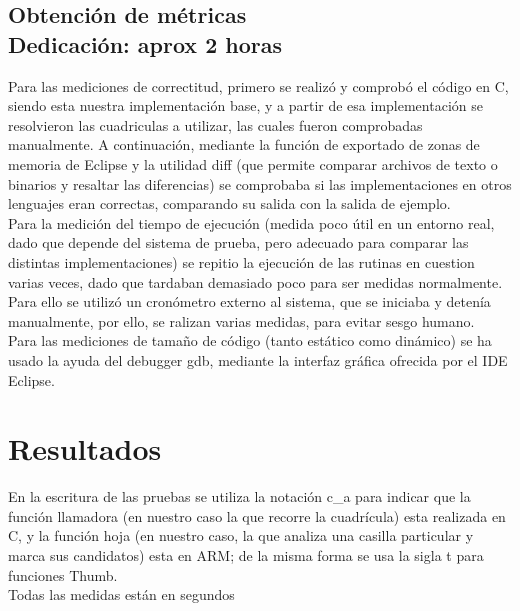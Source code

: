 \documentclass[12pt,letterpaper]{article}
\begin{document}
\subsection{Obtención de métricas\\ {\small Dedicación: aprox 2 horas}}
Para las mediciones de correctitud, primero se realizó y comprobó el
código en C, siendo esta nuestra implementación base, y a partir de
esa implementación se resolvieron las cuadriculas a utilizar, las
cuales fueron comprobadas manualmente. A continuación, mediante la
función de exportado de zonas de memoria de Eclipse y la utilidad diff
(que permite comparar archivos de texto o binarios y resaltar las
diferencias) se comprobaba si las implementaciones en otros lenguajes
eran correctas, comparando su salida con la salida de ejemplo.\\
Para la medición del tiempo de ejecución (medida poco útil en un
entorno real, dado que depende del sistema de prueba, pero adecuado
para comparar las distintas implementaciones) se repitio la ejecución
de las rutinas en cuestion varias veces, dado que tardaban demasiado
poco para ser medidas normalmente. Para ello se utilizó un cronómetro
externo al sistema, que se iniciaba y detenía manualmente, por ello,
se ralizan varias medidas, para evitar sesgo humano.\\
Para las mediciones de tamaño de código (tanto estático como dinámico)
se ha usado la ayuda del debugger gdb, mediante la interfaz gráfica
ofrecida por el IDE Eclipse.

\section{Resultados}
En la escritura de las pruebas se utiliza la notación c\_a para
indicar que la función llamadora (en nuestro caso la que recorre la
cuadrícula) esta realizada en C, y la función hoja (en nuestro
caso, la que analiza una casilla particular y marca sus candidatos)
esta en ARM; de la misma forma se usa la sigla t para funciones Thumb.\\
Todas las medidas están en segundos
\end{document}
